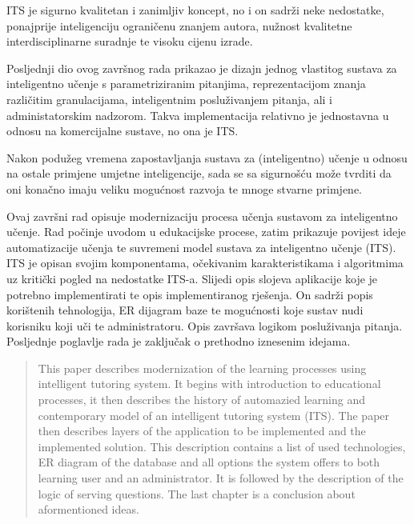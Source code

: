 \documentclass[times, utf8, zavrsni, numeric]{fer}
\begin{document}
\par
ITS je sigurno kvalitetan i zanimljiv koncept, no i on sadrži neke nedostatke, ponajprije inteligenciju ograničenu znanjem autora, nužnost kvalitetne interdisciplinarne suradnje te visoku cijenu izrade.
\par
Posljednji dio ovog završnog rada prikazao je dizajn jednog vlastitog sustava za inteligentno učenje s parametriziranim pitanjima, reprezentacijom znanja različitim granulacijama, inteligentnim posluživanjem pitanja, ali i administatorskim nadzorom. Takva implementacija relativno je jednostavna u odnosu na komercijalne sustave, no ona je ITS.
\par
Nakon podužeg vremena zapostavljanja sustava za (inteligentno) učenje u odnosu na ostale primjene umjetne inteligencije, sada se sa sigurnošću može tvrditi da oni konačno imaju veliku mogućnost razvoja te mnoge stvarne primjene.




\begin{sazetak}
	Ovaj završni rad opisuje modernizaciju procesa učenja sustavom za inteligentno učenje. Rad počinje uvodom u edukacijske procese, zatim prikazuje povijest ideje automatizacije učenja te suvremeni model sustava za inteligentno učenje (ITS). ITS je opisan svojim komponentama, očekivanim karakteristikama i algoritmima uz kritički pogled na nedostatke ITS-a. Slijedi opis slojeva aplikacije koje je potrebno implementirati te opis implementiranog rješenja. On sadrži popis korištenih tehnologija, ER dijagram baze te mogućnosti koje sustav nudi korisniku koji uči te administratoru. Opis završava logikom posluživanja pitanja. Posljednje poglavlje rada je zaključak o prethodno iznesenim idejama. 
	
\end{sazetak}


\begin{abstract}
	This paper describes modernization of the learning processes using intelligent tutoring system. It begins with introduction  to educational processes, it then describes the history of automazied learning and contemporary model of an intelligent tutoring system (ITS). The paper then describes layers of the application to be implemented and the implemented solution. This description contains a list of used technologies, ER diagram of the database and all options the system offers to both learning user and an administrator. It is followed by the description of the logic of serving questions. The last chapter is a conclusion about aformentioned ideas.
	
\end{abstract}
\end{document}
